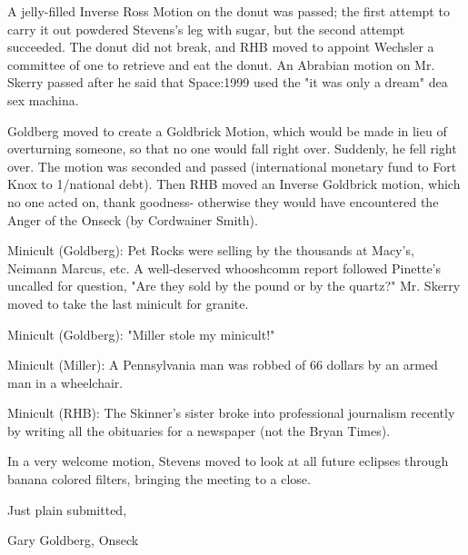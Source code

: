 \documentclass[12pt]{article}
\begin{document}
A jelly-filled Inverse Ross Motion on the donut was passed; the first attempt to carry it out powdered Stevens's leg with sugar, but the second attempt succeeded. The donut did not break, and RHB moved to appoint Wechsler a committee of one to retrieve and eat the donut. An Abrabian motion on Mr. Skerry passed after he said that Space:1999 used the "it was only a dream" dea sex machina.

Goldberg moved to create a Goldbrick Motion, which would be made in lieu of overturning someone, so that no one would fall right over. Suddenly, he fell right over. The motion was seconded and passed (international monetary fund to Fort Knox to 1/national debt). Then RHB moved an Inverse Goldbrick motion, which no one acted on, thank goodness- otherwise they would have encountered the Anger of the Onseck (by Cordwainer Smith).

Minicult (Goldberg): Pet Rocks were selling by the thousands at Macy's, Neimann Marcus, etc. A well-deserved whooshcomm report followed Pinette's uncalled for question, "Are they sold by the pound or by the quartz?" Mr. Skerry moved to take the last minicult for granite.

Minicult (Goldberg): "Miller stole my minicult!"

Minicult (Miller): A Pennsylvania man was robbed of 66 dollars by an armed man in a wheelchair.

Minicult (RHB): The Skinner's sister broke into professional journalism recently by writing all the obituaries for a newspaper (not the Bryan Times).

In a very welcome motion, Stevens moved to look at all future eclipses through banana colored filters, bringing the meeting to a close.

\vspace{12pt}

\centerline{Just plain submitted,}
\centerline{Gary Goldberg, Onseck}
\end{document}

